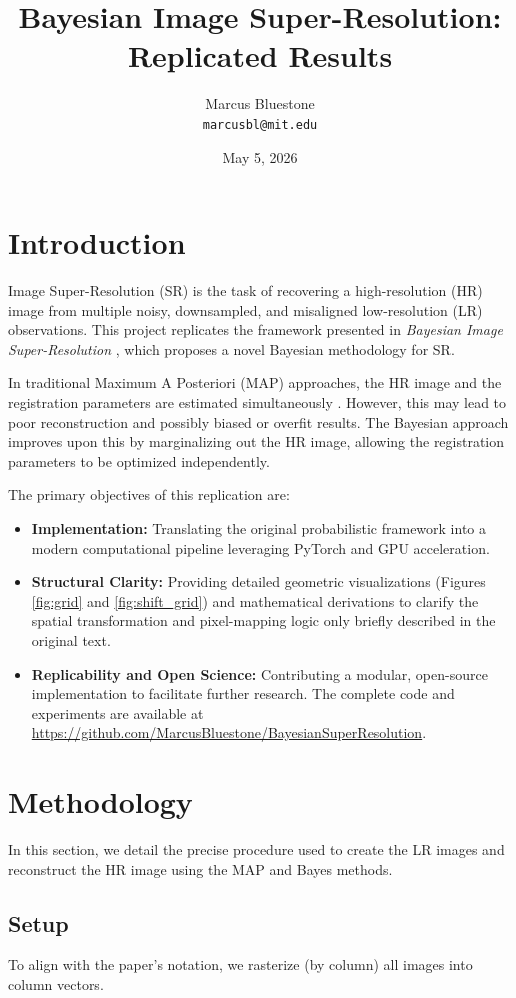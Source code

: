 \documentclass[twocolumn]{article}
\title{\textbf{Bayesian Image Super-Resolution: \\Replicated Results}}
\author{Marcus Bluestone \\ \texttt{marcusbl@mit.edu}}
\date{May 5, 2026}
\begin{document}

\maketitle

\section{Introduction}
Image Super-Resolution (SR) is the task of recovering a high-resolution (HR) image from multiple noisy, downsampled, and misaligned low-resolution (LR) observations. This project replicates the framework presented in \textit{Bayesian Image Super-Resolution} \cite{tipping2003}, which proposes a novel Bayesian methodology for SR. 

In traditional Maximum A Posteriori (MAP) approaches, the HR image and the registration parameters are estimated simultaneously \cite{hardie1997}. However, this may lead to poor reconstruction and possibly biased or overfit results. The Bayesian approach improves upon this by marginalizing out the HR image, allowing the registration parameters to be optimized independently. 

The primary objectives of this replication are:
\begin{itemize}
    \item \textbf{Implementation:} Translating the original probabilistic framework into a modern computational pipeline leveraging PyTorch and GPU acceleration. 
    \item \textbf{Structural Clarity:} Providing detailed geometric visualizations (Figures \ref{fig:grid} and \ref{fig:shift_grid}) and mathematical derivations to clarify the spatial transformation and pixel-mapping logic only briefly described in the original text. 
    \item \textbf{Replicability and Open Science:} Contributing a modular, open-source implementation to facilitate further research. The complete code and experiments are available at \url{https://github.com/MarcusBluestone/BayesianSuperResolution}. 
\end{itemize}
\section{Methodology}
In this section, we detail the precise procedure used to create the LR images and reconstruct the HR image using the MAP and Bayes methods. 

\subsection{Setup}
To align with the paper's notation, we rasterize (by column) all images into column vectors. 
\end{document}
